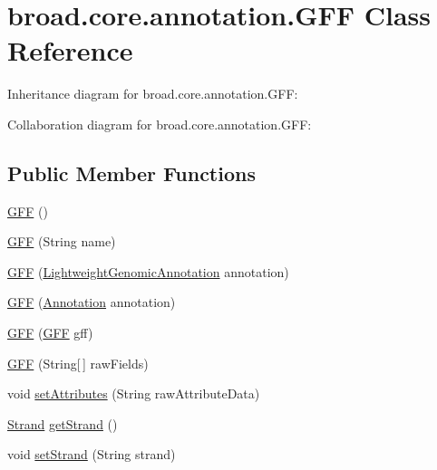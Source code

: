 \hypertarget{classbroad_1_1core_1_1annotation_1_1_g_f_f}{\section{broad.\+core.\+annotation.\+G\+F\+F Class Reference}
\label{classbroad_1_1core_1_1annotation_1_1_g_f_f}
}


Inheritance diagram for broad.\+core.\+annotation.\+G\+F\+F\+:


Collaboration diagram for broad.\+core.\+annotation.\+G\+F\+F\+:
\subsection*{Public Member Functions}
\begin{DoxyCompactItemize}
\item 
\hyperlink{classbroad_1_1core_1_1annotation_1_1_g_f_f_ab077cc4a68225601e6d411f49e76e434}{G\+F\+F} ()
\item 
\hyperlink{classbroad_1_1core_1_1annotation_1_1_g_f_f_a0fff48f1a32ef8857fe9933c8d865baa}{G\+F\+F} (String name)
\item 
\hyperlink{classbroad_1_1core_1_1annotation_1_1_g_f_f_a91c1df0d75d83122e70d776d280738b5}{G\+F\+F} (\hyperlink{interfacebroad_1_1core_1_1annotation_1_1_lightweight_genomic_annotation}{Lightweight\+Genomic\+Annotation} annotation)
\item 
\hyperlink{classbroad_1_1core_1_1annotation_1_1_g_f_f_aaa279b7609b5dac33a236b9ddf311912}{G\+F\+F} (\hyperlink{interfaceumms_1_1core_1_1annotation_1_1_annotation}{Annotation} annotation)
\item 
\hyperlink{classbroad_1_1core_1_1annotation_1_1_g_f_f_a33f3d680ca455b7c999e6ddefb303bee}{G\+F\+F} (\hyperlink{classbroad_1_1core_1_1annotation_1_1_g_f_f}{G\+F\+F} gff)
\item 
\hyperlink{classbroad_1_1core_1_1annotation_1_1_g_f_f_af6eec864fda16bb18f36c6fde1c067e2}{G\+F\+F} (String\mbox{[}$\,$\mbox{]} raw\+Fields)
\item 
void \hyperlink{classbroad_1_1core_1_1annotation_1_1_g_f_f_a896fe7c925e9513bd06cde675fdfa617}{set\+Attributes} (String raw\+Attribute\+Data)
\item 
\hyperlink{enumumms_1_1core_1_1annotation_1_1_annotation_1_1_strand}{Strand} \hyperlink{classbroad_1_1core_1_1annotation_1_1_g_f_f_a55a7daa043957ff87c4fd2d93c5b7447}{get\+Strand} ()
\item 
void \hyperlink{classbroad_1_1core_1_1annotation_1_1_g_f_f_a0b8578bb9313ad95e4affd612318bc15}{set\+Strand} (String strand)

\end{DoxyCompactItemize}
